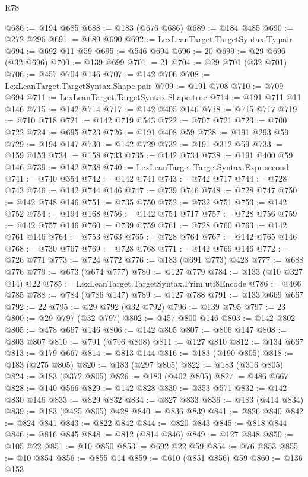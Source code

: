 \begin{lexlean}{R78}
\begin{coremodule}
@686 := @194 @685
@688 := @183 (@676 @686)
@689 := @184 @485
@690 := @272 @296
@691 := @689 @690
@692 := LexLeanTarget.TargetSyntax.Ty.pair
@694 := @692 @11 @59
@695 := @546 @694
@696 := 20
@699 := @29 @696 (@32 @696)
@700 := @139 @699
@701 := 21
@704 := @29 @701 (@32 @701)
@706 := @457 @704 @146
@707 := @142 @706
@708 := LexLeanTarget.TargetSyntax.Shape.pair
@709 := @191 @708
@710 := @709 @694
@711 := LexLeanTarget.TargetSyntax.Shape.true
@714 := @191 @711 @11 @146
@715 := @142 @714
@717 := @142 @405 @146
@718 := @715 @717
@719 := @710 @718
@721 := @142 @719 @543
@722 := @707 @721
@723 := @700 @722
@724 := @695 @723
@726 := @191 @408 @59
@728 := @191 @293 @59
@729 := @194 @147
@730 := @142 @729
@732 := @191 @312 @59
@733 := @159 @153
@734 := @158 @733
@735 := @142 @734
@738 := @191 @400 @59 @146
@739 := @142 @738
@740 := LexLeanTarget.TargetSyntax.Expr.second
@741 := @740 @354
@742 := @142 @741
@743 := @742 @717
@744 := @728 @743
@746 := @142 @744 @146
@747 := @739 @746
@748 := @728 @747
@750 := @142 @748 @146
@751 := @735 @750
@752 := @732 @751
@753 := @142 @752
@754 := @194 @168
@756 := @142 @754 @717
@757 := @728 @756
@759 := @142 @757 @146
@760 := @739 @759
@761 := @728 @760
@763 := @142 @761 @146
@764 := @753 @763
@765 := @728 @764
@767 := @142 @765 @146
@768 := @730 @767
@769 := @728 @768
@771 := @142 @769 @146
@772 := @726 @771
@773 := @724 @772
@776 := @183 (@691 @773) @428
@777 := @688 @776
@779 := @673 (@674 @777)
@780 := @127 @779
@784 := @133 (@10 @327 @14) @22
@785 := LexLeanTarget.TargetSyntax.Prim.utf8Encode
@786 := @466 @785
@788 := @784 (@786 @147)
@789 := @127 @788
@791 := @133 @669 @667
@792 := 22
@795 := @29 @792 (@32 @792)
@796 := @139 @795
@797 := 23
@800 := @29 @797 (@32 @797)
@802 := @457 @800 @146
@803 := @142 @802
@805 := @478 @667 @146
@806 := @142 @805
@807 := @806 @147
@808 := @803 @807
@810 := @791 (@796 @808)
@811 := @127 @810
@812 := @134 @667
@813 := @179 @667
@814 := @813 @144
@816 := @183 (@190 @805)
@818 := @183 (@275 @805)
@820 := @183 (@297 @805)
@822 := @183 (@316 @805)
@824 := @183 (@372 @805)
@826 := @183 (@402 @805)
@827 := @486 @667
@828 := @140 @566
@829 := @142 @828
@830 := @353 @571
@832 := @142 @830 @146
@833 := @829 @832
@834 := @827 @833
@836 := @183 (@414 @834)
@839 := @183 (@425 @805) @428
@840 := @836 @839
@841 := @826 @840
@842 := @824 @841
@843 := @822 @842
@844 := @820 @843
@845 := @818 @844
@846 := @816 @845
@848 := @812 (@814 @846)
@849 := @127 @848
@850 := @105 @22
@851 := @10 @850
@853 := @692 @22 @59
@854 := @76 @853
@855 := @10 @854
@856 := @855 @14
@859 := @610 (@851 @856) @59
@860 := @136 @153

\end{coremodule}
\end{lexlean}
